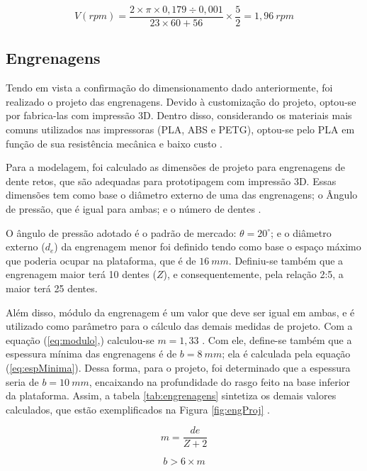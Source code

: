 \begin{equation}
	V(rpm) = \dfrac{2\times\pi\times0,179\div0,001}{23\times60+56}\times\dfrac{5}{2} = 1,96~rpm
	\label{eq:speed}
\end{equation}



\subsection{Engrenagens}

Tendo em vista a confirmação do dimensionamento dado anteriormente, foi realizado o projeto das engrenagens. Devido à customização do projeto, optou-se por fabrica-las com impressão 3D. Dentro disso, considerando os materiais mais comuns utilizados nas impressoras (PLA, ABS e PETG), optou-se pelo PLA em função de sua resistência mecânica e baixo custo \cite{site:3dprinted}. 

Para a modelagem, foi calculado as dimensões de projeto para engrenagens de dente retos, que são adequadas para prototipagem com impressão 3D. Essas dimensões tem como base o diâmetro externo de uma das engrenagens; o Ângulo de pressão, que é igual para ambas; e o número de dentes \cite{site:3dprinted}.  


O ângulo de pressão adotado é o padrão de mercado: $ \theta = 20^{\circ} $; e o diâmetro externo ($ d_e $) da engrenagem menor foi definido tendo como base o espaço máximo que poderia ocupar na plataforma, que é de $ 16~mm $. Definiu-se também que a engrenagem maior terá 10 dentes ($ Z $), e consequentemente, pela relação 2:5, a maior terá 25 dentes.


Além disso, módulo da engrenagem é um valor que deve ser igual em ambas, e é utilizado como parâmetro para o cálculo das demais medidas de projeto. Com a equação (\ref{eq:modulo},) calculou-se $ m = 1,33 $ . Com ele, define-se também que a espessura mínima das engrenagens é de  $ b = 8~mm $; ela é calculada pela equação (\ref{eq:espMinima}). Dessa forma, para o projeto, foi determinado que a espessura seria de $ b = 10~mm $, encaixando na profundidade do rasgo feito na base inferior da plataforma. Assim, a tabela \ref{tab:engrenagens} sintetiza os demais valores calculados, que estão exemplificados na Figura \ref{fig:engProj} \cite{tcc:lucasEngrenagem}.

\begin{equation}
	m = \dfrac{de}{Z+2}
	\label{eq:eq:modulo}
\end{equation}

\begin{equation}
	b > 6 \times m
	\label{eq:eq:espMinima}
\end{equation}

